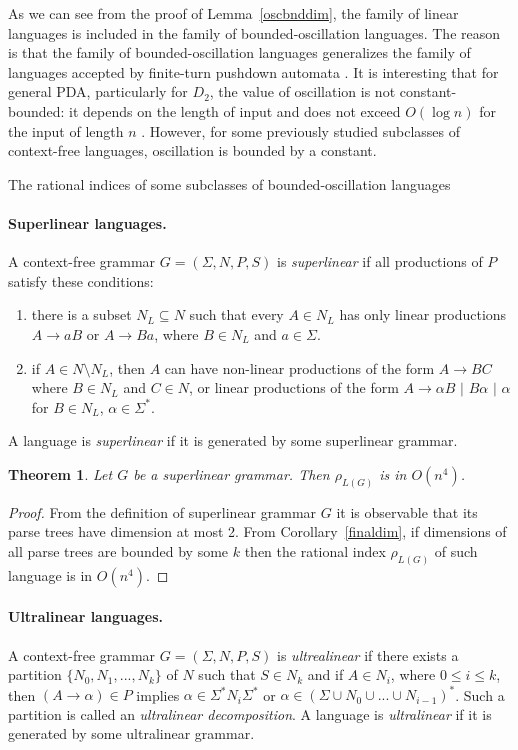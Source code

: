 \documentclass[11pt,a4paper]{article} %
\newtheorem{theorem}{Theorem}
\begin{document}
As we can see from the proof of Lemma~\ref{oscbnddim}, the family of linear languages is included in the family of bounded-oscillation languages. The reason is that the family of bounded-oscillation languages generalizes the family of languages accepted by finite-turn pushdown automata \cite{BoundOsc}. It is interesting that for general PDA, particularly for $D_2$, the value of oscillation is not constant-bounded: it depends on the length of input and does not exceed $O(\log n)$ for the input of length $n$ \cite*{Gundermann, Wechsung}. However, for some previously studied subclasses of context-free languages,  oscillation is bounded by a constant.

\begin{subsection}{The rational indices of some subclasses of bounded-oscillation languages} 

\paragraph{Superlinear languages.} 
A context-free grammar $G = (\Sigma, N, P, S)$ is \textit{superlinear} \cite{superlinear} if all productions of $P$ satisfy these conditions:
\begin{enumerate}
\item there is a subset $N_L \subseteq N$ such that every $A \in N_L$ has only linear productions $A\rightarrow aB$ or $A\rightarrow Ba$, where $B \in N_L$ and $a \in \Sigma$.
\item if $A \in N \setminus N_L$, then $A$ can have non-linear productions of the form $A \rightarrow BC$ where $B\in N_L$ and $C \in N$, or linear productions of the form $A\rightarrow \alpha B$ $\vert$ $B \alpha$ $\vert$ $\alpha$ for $B \in N_L$, $\alpha \in \Sigma^*$.
\end{enumerate}
A language is \textit{superlinear} if it is generated by some superlinear grammar. 
\begin{theorem} Let $G$ be a superlinear grammar. Then $\rho_{L(G)}$ is in $O(n^4)$.
\end{theorem}
\begin{proof}
From the definition of superlinear grammar $G$ it is observable that its parse trees have dimension at most 2. From 
Corollary~\ref{finaldim}, if dimensions of all parse trees are bounded by some $k$ then the rational index $\rho_{L(G)}$ of such language is in $O(n^4)$.
\end{proof}
\end{subsection}
\paragraph{Ultralinear languages.} A context-free grammar $G = (\Sigma, N, P, S)$ is \textit{ultrealinear} if there exists a partition $\{N_0, N_1, ..., N_k\}$ of $N$ such that $S \in N_k$ and if $A \in N_i$, where $0 \le i \le k$, then $(A \rightarrow \alpha) \in P$ implies $\alpha \in \Sigma^*N_i\Sigma^*$ or $\alpha \in {(\Sigma \cup N_0 \cup ... \cup N_{i-1})}^*$. Such a partition is called an \textit{ultralinear decomposition}. A language is \textit{ultralinear} if it is generated by some ultralinear grammar. 
\end{document}
